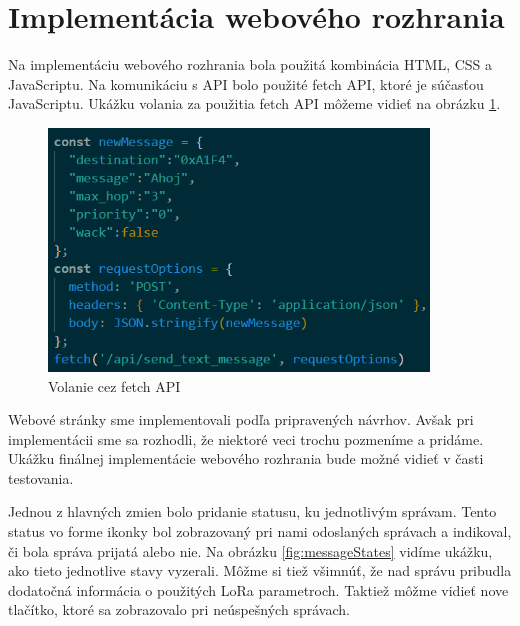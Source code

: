 \documentclass[slovak,master]{diploma}
\begin{document}
\section{Implementácia webového rozhrania}
Na implementáciu webového rozhrania bola použitá kombinácia HTML, CSS a JavaScriptu. Na komunikáciu s API bolo použité fetch API, 
ktoré je súčasťou JavaScriptu. Ukážku volania za použitia fetch API môžeme vidieť na obrázku \ref{fig:fetchApi}.

\begin{figure}[h!]
  \centering
  \includegraphics[width=0.9\textwidth]{Figures/fetchApi.png}
  \caption{Volanie cez fetch API}
  \label{fig:fetchApi}
\end{figure}


Webové stránky sme implementovali podľa pripravených návrhov. Avšak pri implementácii sme sa rozhodli, že 
niektoré veci trochu pozmeníme a pridáme. Ukážku finálnej implementácie webového rozhrania bude možné vidieť v časti testovania.

Jednou z hlavných zmien bolo pridanie statusu, ku jednotlivým správam. 
Tento status vo forme ikonky bol zobrazovaný pri nami odoslaných správach a indikoval, či bola správa prijatá alebo nie. 
Na obrázku \ref{fig:messageStates} vidíme ukážku, ako tieto jednotlive stavy vyzerali. Môžme si tiež všimnúť, že nad správu 
pribudla dodatočná informácia o použitých LoRa parametroch. Taktiež môžme vidieť nove tlačítko, ktoré sa zobrazovalo pri 
neúspešných správach.
\end{document}
